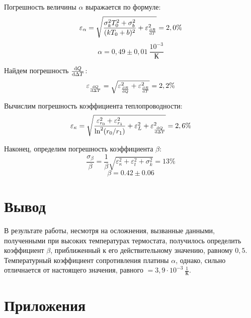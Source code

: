 \documentclass[14pt, a4paper]{report}
\begin{document}
Погрешность величины $\alpha$ выражается по формуле:
\[\varepsilon_{\alpha}=\sqrt{\frac{\sigma_k^2 T_0^2+\sigma_b^2}{(kT_0+b)^2}+\varepsilon_{\dv{R}{T}}^2}=2,0\%\]
\[\alpha=0,49\pm0,01\ \frac{10^{-3}}{К}\]

Найдем погрешность $\dv{Q}{\Delta T}$:
\[\varepsilon_{\dv{Q}{\Delta T}}=\sqrt{\varepsilon_{\dv{R}{Q}}^2 + \varepsilon_{\dv{R}{T}}^2}=2,2\%\]

Вычислим погрешность коэффициента теплопроводности:
\[\varepsilon_{\kappa}=\sqrt{\frac{\varepsilon_{r_0}^2+\varepsilon_{r_1}^2}{\ln^2(r_0/r_1)}+\varepsilon_{L}^2+\varepsilon_{\dv{Q}{\Delta T}}^2}=2,6\%\]

Наконец, определим погрешность коэффициента $\beta$:
\[\frac{\sigma_{\beta}}{\beta}=\frac{1}{\beta}\sqrt{\varepsilon_{\kappa}^2+\varepsilon_{t}^2+\sigma_{k}^2}=13\%\]
\[\beta=0.42\pm0.06\]

\section{Вывод}

В результате работы, несмотря на осложнения, вызванные данными, полученными при высоких температурах термостата, получилось определить коэффициент $\beta$, приближенный к его действительному значению, равному $0,5$. Температурный коэффициент сопротивления платины $\alpha$, однако, сильно отличнается от настоящего значения, равного $=3,9\cdot10^{-3}\ \frac{1}{К}$.

\section{Приложения}

\begin{table}[!ht]
\centering
{}
\caption{Значения $R_м$, подобранные для монотонного возрастания мощности, выделяемой нитью ($Q=\eta\cdot Q_{макс}$)}
\end{table}
\end{document}
